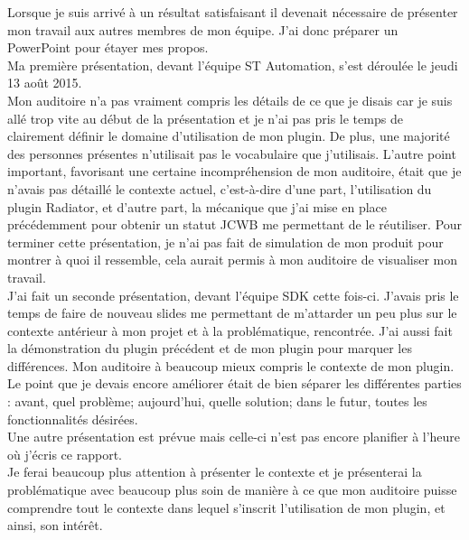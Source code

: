 Lorsque je suis arrivé à un résultat satisfaisant il devenait nécessaire de présenter mon travail aux autres membres de mon équipe. J'ai donc préparer un PowerPoint pour étayer mes propos.\\
Ma première présentation, devant l'équipe ST Automation, s'est déroulée le jeudi 13 août 2015.\\
Mon auditoire n'a pas vraiment compris les détails de ce que je disais car je suis allé trop vite au début de la présentation et je n'ai pas pris le temps de clairement définir le domaine d'utilisation de mon plugin. De plus, une majorité des personnes présentes n'utilisait pas le vocabulaire que j'utilisais. L'autre point important, favorisant une certaine incompréhension de mon auditoire, était que je n'avais pas détaillé le contexte actuel, c'est-à-dire d'une part, l'utilisation du plugin Radiator, et d'autre part, la mécanique que j'ai mise en place précédemment pour obtenir un statut JCWB me permettant de le réutiliser. Pour terminer cette présentation, je n'ai pas fait de simulation de mon produit pour montrer à quoi il ressemble, cela aurait permis à mon auditoire de visualiser mon travail.\\
J'ai fait un seconde présentation, devant l'équipe SDK cette fois-ci. J'avais pris le temps de faire de nouveau slides me permettant de m'attarder un peu plus sur le contexte antérieur à mon projet et à la problématique, rencontrée. J'ai aussi fait la démonstration du plugin précédent et de mon plugin pour marquer les différences. Mon auditoire à beaucoup mieux compris le contexte de mon plugin. Le point que je devais encore améliorer était de bien séparer les différentes parties : avant, quel problème; aujourd'hui, quelle solution; dans le futur, toutes les fonctionnalités désirées.\\
Une autre présentation est prévue mais celle-ci n'est pas encore planifier à l'heure où j'écris ce rapport.\\
Je ferai beaucoup plus attention à présenter le contexte et je présenterai la problématique avec beaucoup plus soin de manière à ce que mon auditoire puisse comprendre tout le contexte dans lequel s'inscrit l'utilisation de mon plugin, et ainsi, son intérêt.\\



